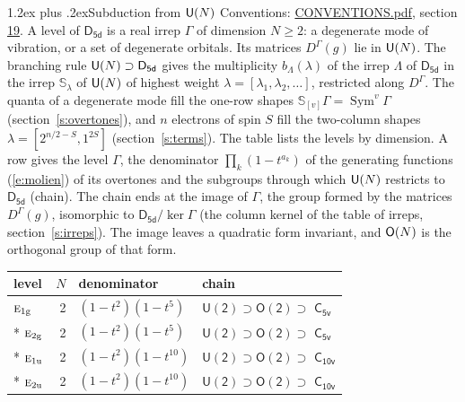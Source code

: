 \documentclass[10pt,a4paper]{article}
\makeatletter
\renewcommand\section{\@startsection{section}{1}{\z@}{-3ex plus -1ex minus -.2ex}%
  {1.2ex plus .2ex}{\normalfont\large\sffamily\bfseries\color{parttitle}}}
\numberwithin{equation}{section}
\newcommand{\grp}[1]{\mathsf{#1}}
\newcommand{\irr}[1]{\text{\normalfont\scshape #1}}
\newcommand{\ptag}[1]{\mathrm{#1}}
\newcommand{\repD}[1]{D^{#1}}
\newcommand{\schur}[1]{\mathbb{S}_{#1}}
\newcommand{\shape}[1]{[#1]}
\makeatother
\begin{document}
\section{Subduction from \texorpdfstring{$\grp{U(\mathnormal{N})}$}{U(N)}}\label{s:unitary}
Conventions: \href{../../CONVENTIONS.pdf}{CONVENTIONS.pdf}, section \href{../../CONVENTIONS.pdf\#conv.19}{19}.
\leavevmode\label{n:local.level.dimension}A level of $\grp{D_{5d}}$ is a real irrep $\Gamma$ of dimension $N \ge 2$: a degenerate mode of vibration, or a set of degenerate orbitals. \label{n:group.unitary}Its matrices $\repD{\Gamma}(g)$ lie in $\grp{U(\mathnormal{N})}$. \label{n:irrep.schur}\label{n:shape.partition}\label{n:local.partition}\label{n:function.multiplicity.unitary}The branching rule $\grp{U(\mathnormal{N})} \supset \grp{D_{5d}}$ gives the multiplicity $b_\Lambda(\lambda)$ of the irrep $\Lambda$ of $\grp{D_{5d}}$ in the irrep $\schur{\lambda}$ of $\grp{U(\mathnormal{N})}$ of highest weight $\lambda = \shape{\lambda_1, \lambda_2, \dots}$, restricted along $\repD{\Gamma}$. \label{n:local.partition.power}\label{n:local.electrons}\label{n:local.spin}The quanta of a degenerate mode fill the one-row shapes $\schur{\shape{v}}\Gamma = \operatorname{Sym}^{v}\Gamma$ (section~\ref{s:overtones}), and $n$ electrons of spin $S$ fill the two-column shapes $\lambda = \shape{2^{n/2-S}, 1^{2S}}$ (section~\ref{s:terms}).
The table lists the levels by dimension. \label{n:head.level}\label{n:head.denominator}\label{n:index.overtone.denominator}\label{n:head.chain}A row gives the level $\Gamma$, the denominator $\prod_k (1 - t^{a_k})$ of the generating functions (\ref{e:molien}) of its overtones and the subgroups through which $\grp{U(\mathnormal{N})}$ restricts to $\grp{D_{5d}}$ (chain). The chain ends at the image of $\Gamma$, the group formed by the matrices $\repD{\Gamma}(g)$, isomorphic to $\grp{D_{5d}}/\ker\Gamma$ (the column kernel of the table of irreps, section~\ref{s:irreps}). The image leaves a quadratic form invariant, and $\grp{O(\mathnormal{N})}$ is the orthogonal group of that form.
{\small\begin{longtable}{@{}lrll@{}}\toprule
level & $N$ & denominator & chain\\\midrule\endhead
\bottomrule\endfoot\endlastfoot
$\irr{e}_{1\ptag{g}}$ & 2 & $(1-t^{2})(1-t^{5})$ & $\grp{U(2)} \supset \grp{O(2)} \supset$ \href{C5v.pdf}{$\grp{C_{5v}}$}\\*
$\irr{e}_{2\ptag{g}}$ & 2 & $(1-t^{2})(1-t^{5})$ & $\grp{U(2)} \supset \grp{O(2)} \supset$ \href{C5v.pdf}{$\grp{C_{5v}}$}\\*
$\irr{e}_{1\ptag{u}}$ & 2 & $(1-t^{2})(1-t^{10})$ & $\grp{U(2)} \supset \grp{O(2)} \supset$ \href{C10v.pdf}{$\grp{C_{10v}}$}\\*
$\irr{e}_{2\ptag{u}}$ & 2 & $(1-t^{2})(1-t^{10})$ & $\grp{U(2)} \supset \grp{O(2)} \supset$ \href{C10v.pdf}{$\grp{C_{10v}}$}\\
\bottomrule\end{longtable}}
\end{document}
